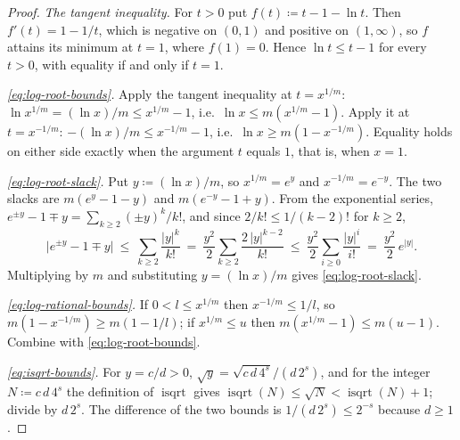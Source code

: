 \begin{proof}
\emph{The tangent inequality.} For $t>0$ put $f(t)\coloneqq t-1-\ln t$. Then
$f'(t)=1-1/t$, which is negative on $(0,1)$ and positive on $(1,\infty)$, so
$f$ attains its minimum at $t=1$, where $f(1)=0$. Hence
$\ln t\le t-1$ for every $t>0$, with equality if and only if $t=1$.

\emph{\eqref{eq:log-root-bounds}.} Apply the tangent inequality at
$t=x^{1/m}$: $\ln x^{1/m}=(\ln x)/m\le x^{1/m}-1$, i.e.\ $\ln x\le
m(x^{1/m}-1)$. Apply it at $t=x^{-1/m}$: $-(\ln x)/m\le x^{-1/m}-1$, i.e.\
$\ln x\ge m(1-x^{-1/m})$. Equality holds on either side exactly when the
argument $t$ equals $1$, that is, when $x=1$.

\emph{\eqref{eq:log-root-slack}.} Put $y\coloneqq(\ln x)/m$, so
$x^{1/m}=e^{y}$ and $x^{-1/m}=e^{-y}$. The two slacks are
$m(e^{y}-1-y)$ and $m(e^{-y}-1+y)$. From the exponential series,
$e^{\pm y}-1\mp y=\sum_{k\ge2}(\pm y)^{k}/k!$, and since $2/k!\le1/(k-2)!$
for $k\ge2$,
\begin{equation*}
  \big|e^{\pm y}-1\mp y\big|\ \le\ \sum_{k\ge2}\frac{|y|^{k}}{k!}
  \ =\ \frac{y^{2}}{2}\sum_{k\ge2}\frac{2\,|y|^{k-2}}{k!}
  \ \le\ \frac{y^{2}}{2}\sum_{i\ge0}\frac{|y|^{i}}{i!}
  \ =\ \frac{y^{2}}{2}\,e^{|y|}.
\end{equation*}
Multiplying by $m$ and substituting $y=(\ln x)/m$ gives
\eqref{eq:log-root-slack}.

\emph{\eqref{eq:log-rational-bounds}.} If $0<l\le x^{1/m}$ then
$x^{-1/m}\le1/l$, so $m(1-x^{-1/m})\ge m(1-1/l)$; if $x^{1/m}\le u$ then
$m(x^{1/m}-1)\le m(u-1)$. Combine with \eqref{eq:log-root-bounds}.

\emph{\eqref{eq:isqrt-bounds}.} For $y=c/d>0$,
$\sqrt{y}=\sqrt{c\,d\,4^{s}}\big/(d\,2^{s})$, and for the integer
$N\coloneqq c\,d\,4^{s}$ the definition of $\operatorname{isqrt}$ gives
$\operatorname{isqrt}(N)\le\sqrt N<\operatorname{isqrt}(N)+1$; divide by
$d\,2^{s}$. The difference of the two bounds is $1/(d\,2^{s})\le2^{-s}$
because $d\ge1$.


\end{proof}
